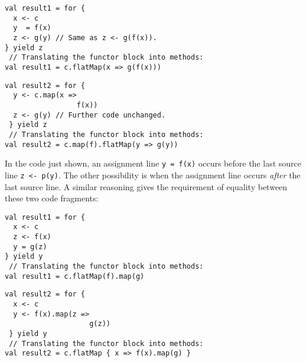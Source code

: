 \noindent \texttt{\textcolor{blue}{\footnotesize{}}}%
\begin{minipage}[c]{0.475\columnwidth}%
\begin{lstlisting}
val result1 = for {
  x <- c
  y  = f(x)
  z <- g(y) // Same as z <- g(f(x)).
} yield z
 // Translating the functor block into methods:
val result1 = c.flatMap(x => g(f(x)))
\end{lstlisting}
%
\end{minipage}\texttt{\textcolor{blue}{\footnotesize{}\hspace*{\fill}}}%
\begin{minipage}[c]{0.475\columnwidth}%
\begin{lstlisting}
val result2 = for {
  y <- c.map(x =>
                 f(x))
  z <- g(y) // Further code unchanged.
 } yield z
 // Translating the functor block into methods:
val result2 = c.map(f).flatMap(y => g(y))
\end{lstlisting}
%
\end{minipage}{\footnotesize\par}

\vspace{0\baselineskip}

In the code just shown, an assignment line \lstinline!y = f(x)! occurs
before the last source line \lstinline!z <- p(y)!. The other possibility
is when the assignment line occurs \emph{after} the last source line.
A similar reasoning gives the requirement of equality between these
two code fragments:

\vspace{0.3\baselineskip}

\noindent \texttt{\textcolor{blue}{\footnotesize{}}}%
\begin{minipage}[c]{0.475\columnwidth}%
\begin{lstlisting}
val result1 = for {
  x <- c
  z <- f(x)
  y = g(z)
} yield y
 // Translating the functor block into methods:
val result1 = c.flatMap(f).map(g)
\end{lstlisting}
%
\end{minipage}\texttt{\textcolor{blue}{\footnotesize{}\hspace*{\fill}}}%
\begin{minipage}[c]{0.475\columnwidth}%
\begin{lstlisting}
val result2 = for {
  x <- c
  y <- f(x).map(z =>
                    g(z))
 } yield y
 // Translating the functor block into methods:
val result2 = c.flatMap { x => f(x).map(g) }
\end{lstlisting}
%
\end{minipage}\vspace{0\baselineskip}

